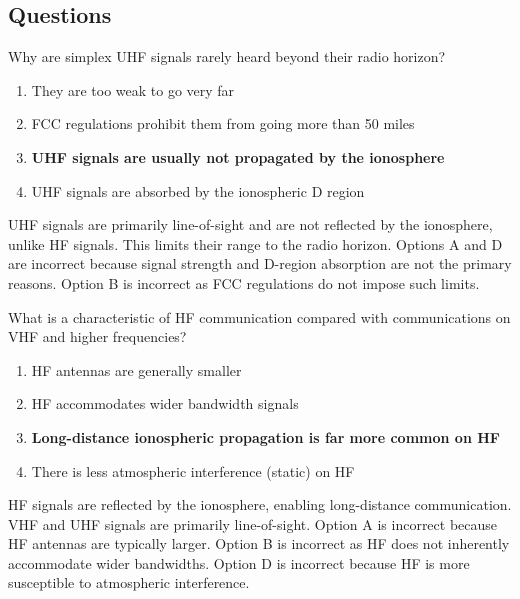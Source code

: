 \subsection*{Questions}
\begin{tcolorbox}[colback=gray!10!white,colframe=black!75!black,title={T3C01}]
    Why are simplex UHF signals rarely heard beyond their radio horizon?
    \begin{enumerate}[label=\Alph*,noitemsep]
        \item They are too weak to go very far
        \item FCC regulations prohibit them from going more than 50 miles
        \item \textbf{UHF signals are usually not propagated by the ionosphere}
        \item UHF signals are absorbed by the ionospheric D region
    \end{enumerate}
\end{tcolorbox}
UHF signals are primarily line-of-sight and are not reflected by the ionosphere, unlike HF signals. This limits their range to the radio horizon. Options A and D are incorrect because signal strength and D-region absorption are not the primary reasons. Option B is incorrect as FCC regulations do not impose such limits.


\begin{tcolorbox}[colback=gray!10!white,colframe=black!75!black,title={T3C02}]
    What is a characteristic of HF communication compared with communications on VHF and higher frequencies?
    \begin{enumerate}[label=\Alph*,noitemsep]
        \item HF antennas are generally smaller
        \item HF accommodates wider bandwidth signals
        \item \textbf{Long-distance ionospheric propagation is far more common on HF}
        \item There is less atmospheric interference (static) on HF
    \end{enumerate}
\end{tcolorbox}
HF signals are reflected by the ionosphere, enabling long-distance communication. VHF and UHF signals are primarily line-of-sight. Option A is incorrect because HF antennas are typically larger. Option B is incorrect as HF does not inherently accommodate wider bandwidths. Option D is incorrect because HF is more susceptible to atmospheric interference.

